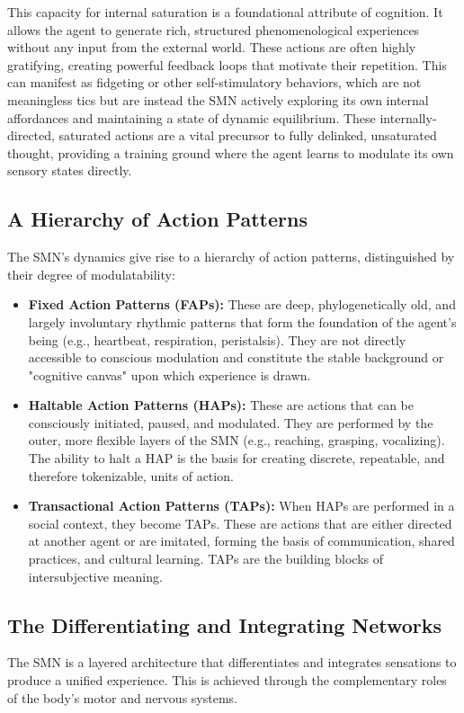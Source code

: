 This capacity for internal saturation is a foundational attribute of cognition. It allows the agent to generate rich, structured phenomenological experiences without any input from the external world. These actions are often highly gratifying, creating powerful feedback loops that motivate their repetition. This can manifest as fidgeting or other self-stimulatory behaviors, which are not meaningless tics but are instead the SMN actively exploring its own internal affordances and maintaining a state of dynamic equilibrium. These internally-directed, saturated actions are a vital precursor to fully delinked, unsaturated thought, providing a training ground where the agent learns to modulate its own sensory states directly.

\subsection{A Hierarchy of Action Patterns}
\label{subsec:hierarchy}
The SMN's dynamics give rise to a hierarchy of action patterns, distinguished by their degree of modulatability:
\begin{itemize}
    \item \textbf{Fixed Action Patterns (FAPs):} These are deep, phylogenetically old, and largely involuntary rhythmic patterns that form the foundation of the agent's being (e.g., heartbeat, respiration, peristalsis). They are not directly accessible to conscious modulation and constitute the stable background or "cognitive canvas" upon which experience is drawn.
    \item \textbf{Haltable Action Patterns (HAPs):} These are actions that can be consciously initiated, paused, and modulated. They are performed by the outer, more flexible layers of the SMN (e.g., reaching, grasping, vocalizing). The ability to halt a HAP is the basis for creating discrete, repeatable, and therefore tokenizable, units of action.
    \item \textbf{Transactional Action Patterns (TAPs):} When HAPs are performed in a social context, they become TAPs. These are actions that are either directed at another agent or are imitated, forming the basis of communication, shared practices, and cultural learning. TAPs are the building blocks of intersubjective meaning.
\end{itemize}

\subsection{The Differentiating and Integrating Networks}
\label{subsec:networks}
The SMN is a layered architecture that differentiates and integrates sensations to produce a unified experience. This is achieved through the complementary roles of the body's motor and nervous systems.

